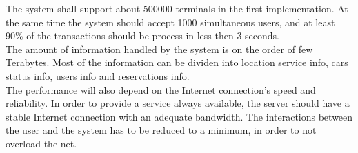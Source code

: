 The system shall support about 500000 terminals in the first implementation. At the same time the system should accept 1000 simultaneous users, and at least 90\% of the transactions should be process in less then 3 seconds.
\\The amount of information handled by the system is on the order of few Terabytes. Most of the information can be dividen into location service info, cars status info, users info and reservations info.
\\The performance will also depend on the Internet connection's speed and reliability. In order to provide a service always available, the server should have a stable Internet connection with an adequate bandwidth.
The interactions between the user and the system has to be reduced to a minimum, in order to not overload the net. 